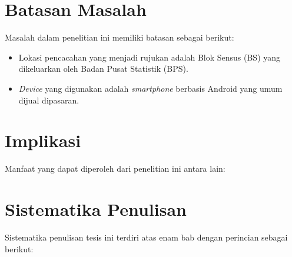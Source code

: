 \section{Batasan Masalah}

Masalah dalam penelitian ini memiliki batasan sebagai berikut:

\begin{itemize}
\item Lokasi pencacahan yang menjadi rujukan adalah Blok Sensus (BS) yang dikeluarkan oleh Badan Pusat Statistik (BPS).
\item \textit{Device} yang digunakan adalah \textit{smartphone} berbasis Android yang umum dijual dipasaran.
\end{itemize}


\section{Implikasi}

Manfaat yang dapat diperoleh dari penelitian ini antara lain:


\section{Sistematika Penulisan}

Sistematika penulisan tesis ini terdiri atas enam bab dengan perincian sebagai berikut:

